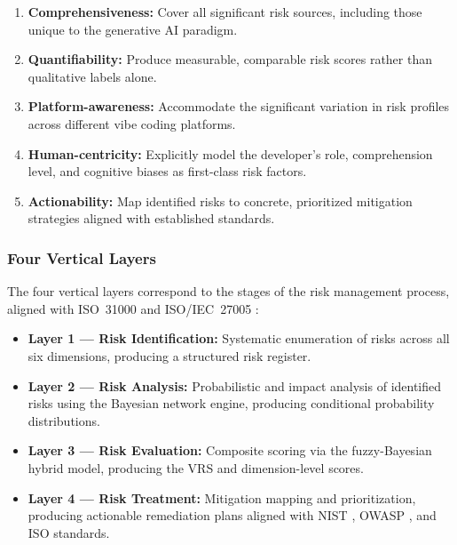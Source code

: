 \documentclass[preprint,review,12pt]{elsarticle}
\begin{document}
\begin{enumerate}[label=\textbf{DP\arabic*.}]
    \item \textbf{Comprehensiveness:} Cover all significant risk sources, including those unique to the generative AI paradigm.
    \item \textbf{Quantifiability:} Produce measurable, comparable risk scores rather than qualitative labels alone.
    \item \textbf{Platform-awareness:} Accommodate the significant variation in risk profiles across different vibe coding platforms.
    \item \textbf{Human-centricity:} Explicitly model the developer's role, comprehension level, and cognitive biases as first-class risk factors.
    \item \textbf{Actionability:} Map identified risks to concrete, prioritized mitigation strategies aligned with established standards.
\end{enumerate}


\subsubsection{Four Vertical Layers}

The four vertical layers correspond to the stages of the risk management process, aligned with ISO~31000 \cite{iso31000} and ISO/IEC~27005 \cite{iso27005}:

\begin{itemize}
    \item \textbf{Layer 1 --- Risk Identification:} Systematic enumeration of risks across all six dimensions, producing a structured risk register.
    \item \textbf{Layer 2 --- Risk Analysis:} Probabilistic and impact analysis of identified risks using the Bayesian network engine, producing conditional probability distributions.
    \item \textbf{Layer 3 --- Risk Evaluation:} Composite scoring via the fuzzy-Bayesian hybrid model, producing the VRS and dimension-level scores.
    \item \textbf{Layer 4 --- Risk Treatment:} Mitigation mapping and prioritization, producing actionable remediation plans aligned with NIST \cite{nist2023ai}, OWASP \cite{owasp2021top10}, and ISO standards.
\end{itemize}
\end{document}
